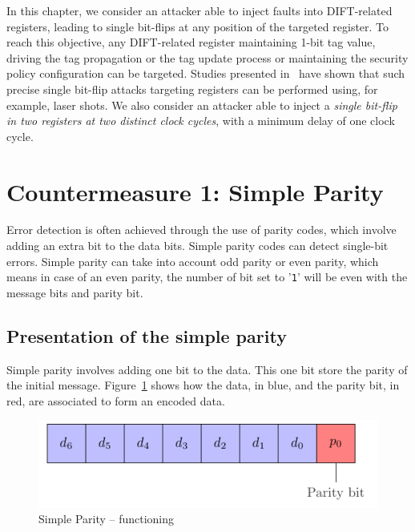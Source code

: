 In this chapter, we consider an attacker able to inject faults into DIFT-related registers, leading to single bit-flips at any position of the targeted register. To reach this objective, any DIFT-related register maintaining 1-bit tag value, driving the tag propagation or the tag update process or maintaining the security policy configuration can be targeted. Studies presented in~\cite{ZDCRT-12-dcis,CLFT-14-cosade} have shown that such precise single bit-flip attacks targeting registers can be performed using, for example, laser shots. We also consider an attacker able to inject a \textit{single bit-flip in two registers at two distinct clock cycles}, with a minimum delay of one clock cycle.

\section{Countermeasure 1: Simple Parity}
\label{chapter:simpleparity}

Error detection is often achieved through the use of parity codes, which involve adding an extra bit to the data bits. Simple parity codes can detect single-bit errors. Simple parity can take into account odd parity or even parity, which means in case of an even parity, the number of bit set to '\texttt{1}' will be even with the message bits and parity bit.

\subsection{Presentation of the simple parity}
Simple parity involves adding one bit to the data. This one bit store the parity of the initial message. Figure~\ref{fig:simpleparity_functionning} shows how the data, in blue, and the parity bit, in red, are associated to form an encoded data.

\begin{figure}[ht]
    \centering
    \includegraphics[page=1]{c5_countermeasures_dift/img/simple_parity.pdf}
    \caption{Simple Parity -- functioning}
    \label{fig:simpleparity_functionning}
\end{figure}

